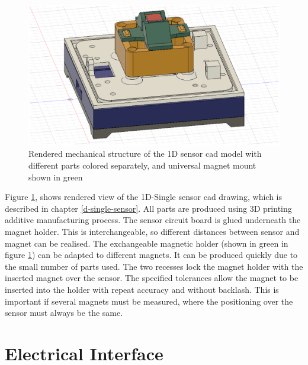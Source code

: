 \begin{figure}
\centering
\includegraphics{./generated_images/border_Rendered_mechanical_structure_of_the_1D_sensor_(+cad)_model_with_different_parts_colored_separately,_and_universal_magnet_mount_shown_in_green.png}
\caption{Rendered mechanical structure of the 1D sensor \gls{cad} model
with different parts colored separately, and universal magnet mount
shown in green
\label{Rendered_mechanical_structure_of_the_1D_sensor_(+cad)_model_with_different_parts_colored_separately,_and_universal_magnet_mount_shown_in_green.png}}
\end{figure}

Figure
\ref{Rendered_mechanical_structure_of_the_1D_sensor_(+cad)_model_with_different_parts_colored_separately,_and_universal_magnet_mount_shown_in_green.png},
shows rendered view of the 1D-Single sensor \gls{cad} drawing, which is
described in chapter \ref{d-single-sensor}. All parts are produced using
3D printing additive manufacturing process. The sensor circuit board is
glued underneath the magnet holder. This is interchangeable, so
different distances between sensor and magnet can be realised. The
exchangeable magnetic holder (shown in green in figure
\ref{Rendered_mechanical_structure_of_the_1D_sensor_(+cad)_model_with_different_parts_colored_separately,_and_universal_magnet_mount_shown_in_green.png})
can be adapted to different magnets. It can be produced quickly due to
the small number of parts used. The two recesses lock the magnet holder
with the inserted magnet over the sensor. The specified tolerances allow
the magnet to be inserted into the holder with repeat accuracy and
without backlash. This is important if several magnets must be measured,
where the positioning over the sensor must always be the same.

\hypertarget{electrical-interface}{%
\section{Electrical Interface}\label{electrical-interface}}

